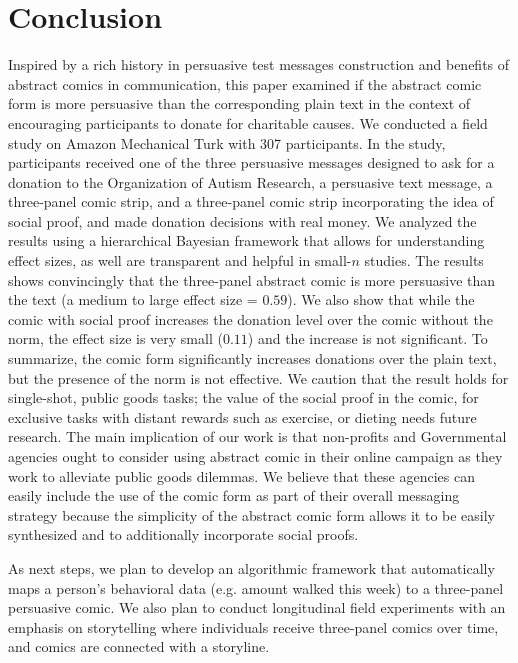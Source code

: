\section{Conclusion}
\label{sec:Conclusion}

Inspired by a rich history in persuasive test messages construction and benefits of abstract comics in communication, this paper examined if the abstract comic form is more persuasive than the corresponding plain text in the context of encouraging participants to donate for charitable causes. We conducted a field study on Amazon Mechanical Turk with 307 participants. In the study, participants received one of the three persuasive messages designed to ask for a donation to the Organization of Autism Research, a persuasive text message, a three-panel comic strip, and a three-panel comic strip incorporating the idea of social proof, and made donation decisions with real money. We analyzed the results using a hierarchical Bayesian framework that allows for understanding effect sizes, as well are transparent and helpful in small-$n$ studies. The results shows convincingly that the three-panel abstract comic is more persuasive than the text (a medium to large effect size = $0.59$). We also show that while the comic with social proof increases the donation level over the comic without the norm, the effect size is very small ($0.11$) and the increase is not significant. To summarize, the comic form significantly increases donations over the plain text, but the presence of the norm is not effective. We caution that the result holds for single-shot, public goods tasks; the value of the social proof in the comic, for exclusive tasks with distant rewards such as exercise, or dieting needs future research. The main implication of our work is that non-profits and Governmental agencies ought to consider using abstract comic in their online campaign as they work to alleviate public goods dilemmas. We believe that these agencies can easily include the use of the comic form as part of their overall messaging strategy because the simplicity of the abstract comic form allows it to be easily synthesized and to additionally incorporate social proofs. 

As next steps, we plan to develop an algorithmic framework that automatically maps a person's behavioral data (e.g. amount walked this week) to a three-panel persuasive comic. We also plan to conduct longitudinal field experiments with an emphasis on storytelling where individuals receive three-panel comics over time, and comics are connected with a storyline.

